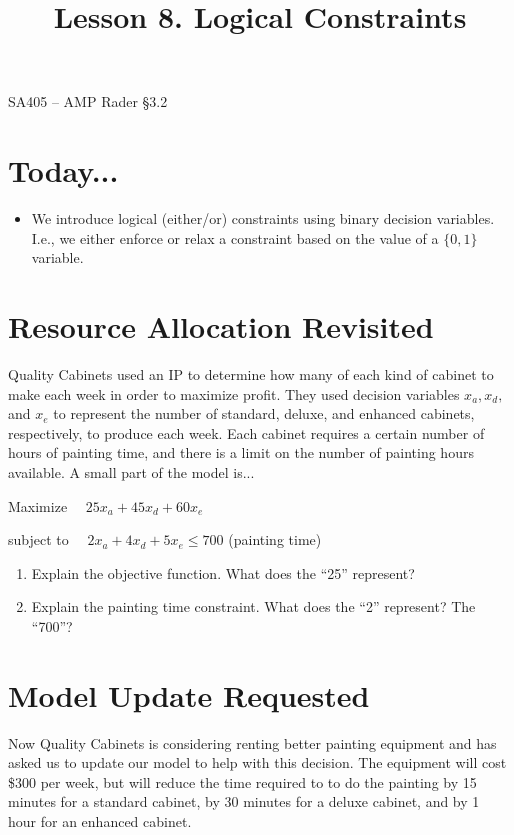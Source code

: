 \documentclass[11pt]{article}
\makeatletter
\theoremstyle{definition}
\newcommand{\answerbox}[3]{%
  \fbox{%
    \begin{minipage}[#1]{#2}
      \hfill\vspace{#3}
    \end{minipage}
  }
}
\newcommand{\answerboxone}[2]{%
  \answerbox{#1}{6.0in}{#2} 
}
\renewcommand{\maketitle}{
  \noindent SA405 -- AMP \hfill Rader \S 3.2 \\

  \begin{center}\Large{\textbf{\@title}}\end{center}
}
\makeatother
\begin{document}
  
\title{Lesson 8.  Logical Constraints}

\maketitle

\section{Today...}

\begin{itemize}
	\item  We introduce logical (either/or) constraints using binary decision variables.  I.e., we either enforce or relax a constraint based on the value of a $\{0,1\}$ variable.
\end{itemize}

\section{Resource Allocation Revisited}
Quality Cabinets used an IP to determine how many of each kind of cabinet to make each week in order to maximize profit.  They used decision variables $x_a, x_d,$ and $x_e$ to represent the number of standard, deluxe, and enhanced cabinets, respectively, to produce each week.  Each cabinet requires a certain number of hours of painting time, and there is a limit on the number of painting hours available.  A small part of the model is...

\begin{tcolorbox}
Maximize ~~$25x_a + 45x_d + 60x_e$

\smallskip
subject to ~~$2x_a + 4x_d + 5x_e \leq 700$ \hspace{1in} (painting time)
\end{tcolorbox}

\renewcommand{\labelenumi}{(\arabic{enumi})}
\begin{enumerate}
\item Explain the objective function.  What does the ``25'' represent?\\
\answerboxone{c}{1in}

\item Explain the painting time constraint.  What does the ``2'' represent?  The ``700''?\\
\answerboxone{c}{1in}
\end{enumerate}

\section{Model Update Requested}
Now Quality Cabinets is considering renting better painting equipment and has asked us to update our model to help with this decision.  The equipment will cost \$300 per week, but will reduce the time required to to do the painting by 15 minutes for a standard cabinet, by 30 minutes for a deluxe cabinet, and by 1 hour for an enhanced cabinet.
\end{document}
